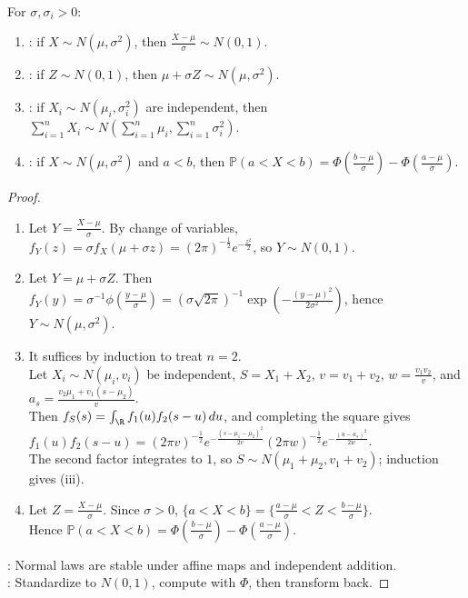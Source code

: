 \begin{proposition} \label{prop:normal-standardization-and-sums} \\
For $\sigma,\sigma_i>0$:
\begin{enumerate}[label=(\roman*)]
\setlength{\itemsep}{0pt}
\item {}: if $X\sim N(\mu,\sigma^2)$, then $\frac{X-\mu}{\sigma}\sim N(0,1)$.
\item {}: if $Z\sim N(0,1)$, then $\mu+\sigma Z\sim N(\mu,\sigma^2)$.
\item {}: if $X_i\sim N(\mu_i,\sigma_i^2)$ are independent, then $\sum\limits_{i=1}^{n}X_i\sim N(\sum\limits_{i=1}^{n}\mu_i,\sum\limits_{i=1}^{n}\sigma_i^2)$.
\item {}: if $X\sim N(\mu,\sigma^2)$ and $a<b$, then $\mathbb{P}(a<X<b)=\Phi(\frac{b-\mu}{\sigma})-\Phi(\frac{a-\mu}{\sigma})$.
\end{enumerate}
\begin{proof}
\begin{enumerate}[label=(\roman*)]
\setlength{\itemsep}{0pt}
\item Let $Y=\frac{X-\mu}{\sigma}$. By change of variables, $f_Y(z)=\sigma f_X(\mu+\sigma z)=(2\pi)^{-\frac{1}{2}}e^{-\frac{z^2}{2}}$, so $Y\sim N(0,1)$.
\item Let $Y=\mu+\sigma Z$. Then $f_Y(y)=\sigma^{-1}\phi(\frac{y-\mu}{\sigma})=(\sigma\sqrt{2\pi})^{-1}\exp(-\frac{(y-\mu)^2}{2\sigma^2})$, hence $Y\sim N(\mu,\sigma^2)$.
\item It suffices by induction to treat $n=2$.\\
Let $X_i\sim N(\mu_i,v_i)$ be independent, $S=X_1+X_2$, $v=v_1+v_2$, $w=\frac{v_1v_2}{v}$, and $a_s=\frac{v_2\mu_1+v_1(s-\mu_2)}{v}$.\\
Then $f_S(s)=\int_\R f_1(u)f_2(s-u)\,du$, and completing the square gives\\
$f_1(u)f_2(s-u)=(2\pi v)^{-\frac{1}{2}}e^{-\frac{(s-\mu_1-\mu_2)^2}{2v}}(2\pi w)^{-\frac{1}{2}}e^{-\frac{(u-a_s)^2}{2w}}$.\\
The second factor integrates to $1$, so $S\sim N(\mu_1+\mu_2,v_1+v_2)$; induction gives (iii).
\item Let $Z=\frac{X-\mu}{\sigma}$. Since $\sigma>0$, $\{a<X<b\}=\{\frac{a-\mu}{\sigma}<Z<\frac{b-\mu}{\sigma}\}$.\\
Hence $\mathbb{P}(a<X<b)=\Phi(\frac{b-\mu}{\sigma})-\Phi(\frac{a-\mu}{\sigma})$.
\end{enumerate}
: Normal laws are stable under affine maps and independent addition.\\
: Standardize to $N(0,1)$, compute with $\Phi$, then transform back.
\end{proof}
\end{proposition}

